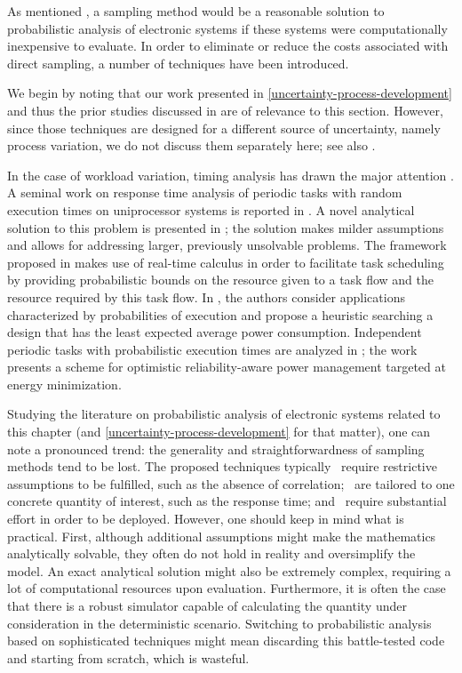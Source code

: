 As mentioned , a sampling method would be a reasonable solution to
probabilistic analysis of electronic systems if these systems were
computationally inexpensive to evaluate. In order to eliminate or reduce the
costs associated with direct sampling, a number of techniques have been
introduced.

We begin by noting that our work presented in
\cref{uncertainty-process-development} and thus the prior studies discussed in
 are of relevance to this section. However, since those
techniques are designed for a different source of uncertainty, namely process
variation, we do not discuss them separately here; see also
.

In the case of workload variation, timing analysis has drawn the major attention
\cite{quinton2012}. A seminal work on response time analysis of periodic tasks
with random execution times on uniprocessor systems is reported in
\cite{diaz2002}. A novel analytical solution to this problem is presented in
\cite{tanasa2015}; the solution makes milder assumptions and allows for
addressing larger, previously unsolvable problems. The framework proposed in
\cite{santinelli2011} makes use of real-time calculus in order to facilitate
task scheduling by providing probabilistic bounds on the resource given to a
task flow and the resource required by this task flow. In
\cite{schranzhofer2009}, the authors consider applications characterized by
probabilities of execution and propose a heuristic searching a design that has
the least expected average power consumption. Independent periodic tasks with
probabilistic execution times are analyzed in \cite{zhu2008}; the work presents
a scheme for optimistic reliability-aware power management targeted at energy
minimization.

Studying the literature on probabilistic analysis of electronic systems related
to this chapter (and \cref{uncertainty-process-development} for that matter),
one can note a pronounced trend: the generality and straightforwardness of
sampling methods tend to be lost. The proposed techniques typically \one~require
restrictive assumptions to be fulfilled, such as the absence of correlation;
\two~are tailored to one concrete quantity of interest, such as the response
time; and \three~require substantial effort in order to be deployed. However,
one should keep in mind what is practical. First, although additional
assumptions might make the mathematics analytically solvable, they often do not
hold in reality and oversimplify the model. An exact analytical solution might
also be extremely complex, requiring a lot of computational resources upon
evaluation. Furthermore, it is often the case that there is a robust simulator
capable of calculating the quantity under consideration in the deterministic
scenario. Switching to probabilistic analysis based on sophisticated techniques
might mean discarding this battle-tested code and starting from scratch, which
is wasteful.

